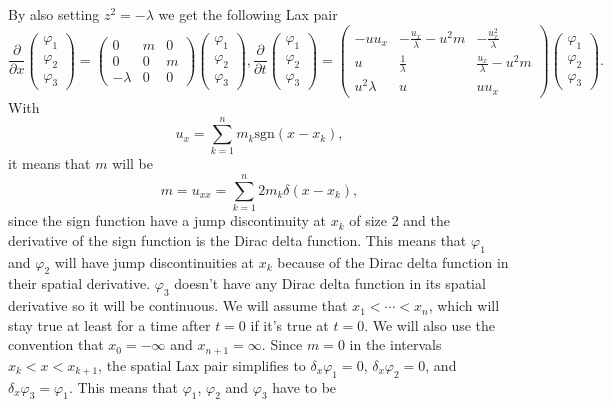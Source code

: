 \documentclass[english,master]{liumaiex}
\theoremstyle{plain}
\theoremstyle{definition}
\newcommand{\sgn}{\text{sgn}}
\begin{document}
By also setting $z^2 = -\lambda$ we get the following Lax pair
\begin{subequations}
\begin{equation}
\frac{\partial}{\partial x}
\begin{pmatrix} \varphi_1 \\ \varphi_2 \\ \varphi_3 \end{pmatrix} =
\begin{pmatrix}
	0 & m & 0 \\
	0 & 0 & m \\
	-\lambda & 0 & 0
\end{pmatrix}
\begin{pmatrix} \varphi_1 \\ \varphi_2 \\ \varphi_3 \end{pmatrix}
,
\end{equation}
\begin{equation}
\frac{\partial}{\partial t}
\begin{pmatrix} \varphi_1 \\ \varphi_2 \\ \varphi_3 \end{pmatrix} =
\begin{pmatrix}
	-u u_x & -\frac{u_x}{\lambda}-u^2 m & -\frac{u_x^2}{\lambda} \\
	u & \frac{1}{\lambda} & \frac{u_x}{\lambda} - u^2 m \\
	u^2\lambda & u & uu_x
\end{pmatrix}
\begin{pmatrix} \varphi_1 \\ \varphi_2 \\ \varphi_3 \end{pmatrix}
.
\end{equation}
\end{subequations}
%
%
With
\begin{equation}
	u_x = \sum_{k=1}^n m_k \sgn(x - x_k),
\end{equation}
it means that $m$ will be
\begin{equation}
	m = u_{xx} = \sum_{k=1}^n 2 m_k \delta(x - x_k),
\end{equation}
since the sign function have a jump discontinuity at $x_k$ of size 2 and the derivative of the sign function is the Dirac delta function. This means that $\varphi_1$ and $\varphi_2$ will have jump discontinuities at $x_k$ because of the Dirac delta function in their spatial derivative. $\varphi_3$ doesn't have any Dirac delta function in its spatial derivative so it will be continuous. We will assume that $x_1 < \cdots < x_n$, which will stay true at least for a time after $t = 0$ if it's true at $t = 0$. We will also use the convention that $x_0 = -\infty$ and $x_{n+1} = \infty$. Since $m = 0$ in the intervals $x_k < x < x_{k+1}$, the spatial Lax pair simplifies to $\delta_x \varphi_1 = 0$, $\delta_x \varphi_2 = 0$, and $\delta_x \varphi_3 = \varphi_1$. This means that $\varphi_1$, $\varphi_2$ and $\varphi_3$ have to be
\end{document}
